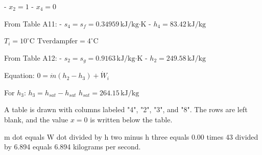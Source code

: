 - \( x_2 = 1 \)  
- \( x_4 = 0 \)  

From Table A11:  
- \( s_4 = s_f = 0.34959 \, \text{kJ/kg·K} \)  
- \( h_4 = 83.42 \, \text{kJ/kg} \)  

\( T_i = 10^\circ \text{C} \)  
\( \text{Tverdampfer} = 4^\circ \text{C} \)  

From Table A12:  
- \( s_2 = s_g = 0.9163 \, \text{kJ/kg·K} \)  
- \( h_2 = 249.58 \, \text{kJ/kg} \)  

Equation:  
\( 0 = \dot{m} (h_2 - h_3) + \dot{W}_i \)  

For \( h_3 \):  
\( h_3 = h_{sat} - h_{sat} \)  
\( h_{sat} = 264.15 \, \text{kJ/kg} \)  

A table is drawn with columns labeled "4", "2", "3", and "8". The rows are left blank, and the value \( x = 0 \) is written below the table.

m dot equals W dot divided by h two minus h three equals 0.00 times 43 divided by 6.894 equals 6.894 kilograms per second.